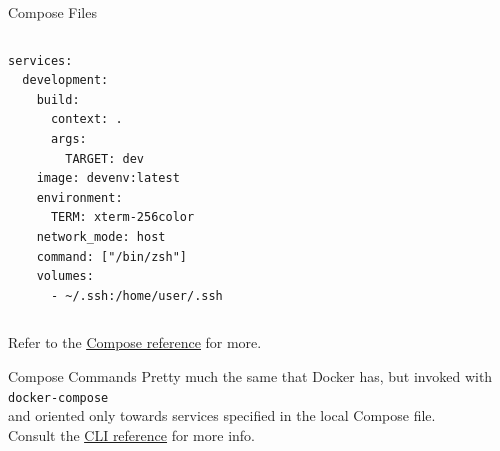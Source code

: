 \begin{frame}[fragile]{Compose Files}
\begin{columns}
\begin{lstlisting}[language=compose, caption=Minimal example of a Compose file]
services:
  development:
    build:
      context: .
      args:
        TARGET: dev
    image: devenv:latest
    environment:
      TERM: xterm-256color
    network_mode: host
    command: ["/bin/zsh"]
    volumes:
      - ~/.ssh:/home/user/.ssh
\end{lstlisting}
\end{columns}
Refer to the \href{https://docs.docker.com/compose/compose-file/}{\color{blue}\underline{Compose reference}} for more.
\end{frame}

\begin{frame}{Compose Commands}
Pretty much the same that Docker has, but invoked with\\\vspace{2pt}
\texttt{docker-compose}\\\vspace{2pt}
and oriented only towards services specified in the local Compose file.\\
Consult the \href{https://docs.docker.com/compose/reference/}{\color{blue}\underline{CLI reference}} for more info.
\end{frame}
